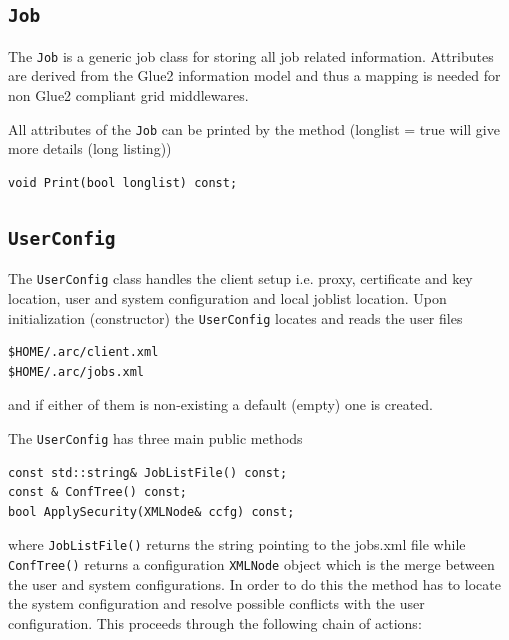 \documentclass{book}
\newcommand{\Job}{\texttt{Job}}
\newcommand{\UserConfig}{\texttt{UserConfig}}
\newcommand{\XMLNode}{\texttt{XMLNode}}
\begin{document}
\subsection{{\Job}}

The {\Job} is a generic job class for storing all job related
information. Attributes are derived from the Glue2 information model
and thus a mapping is needed for non Glue2 compliant grid middlewares.

All attributes of the {\Job} can be printed by the method (longlist = true 
will give more details (long listing))

\begin{shaded}
\begin{verbatim}
void Print(bool longlist) const;
\end{verbatim}
\end{shaded}

\subsection{{\UserConfig}}

The {\UserConfig} class handles the client setup i.e. proxy,
certificate and key location, user and system configuration and local
joblist location. Upon initialization (constructor) the {\UserConfig}
locates and reads the user files

\begin{shaded}
\begin{verbatim}
$HOME/.arc/client.xml
$HOME/.arc/jobs.xml
\end{verbatim}
\end{shaded}

and if either of them is non-existing a default (empty) one is created.

The {\UserConfig} has three main public methods

\begin{shaded}
\begin{verbatim}
const std::string& JobListFile() const;
const & ConfTree() const;
bool ApplySecurity(XMLNode& ccfg) const;
\end{verbatim}
\end{shaded}

where \texttt{JobListFile()} returns the string pointing to the
jobs.xml file while \texttt{ConfTree()} returns a configuration
{\XMLNode} object which is the merge between the user and system
configurations. In order to do this the method has to locate the
system configuration and resolve possible conflicts with the user
configuration. This proceeds through the following chain of actions:
\end{document}
